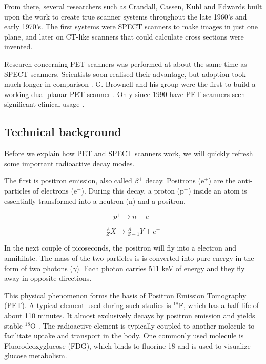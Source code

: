 From there, several researchers such as Crandall, Cassen, Kuhl and Edwards built
upon the work to create true scanner systems throughout the late 1960's and
early 1970's. The first systems were SPECT scanners to make images in just one
plane, and later on CT-like scanners that could calculate cross sections were
invented.

Research concerning PET scanners was performed at about the same time
as SPECT scanners. Scientists soon realised their advantage, but adoption took
much longer in comparison \cite{petreview}. G. Brownell and his group were the
first to build a working dual planar PET scanner \cite{brownell}. Only since
1990 have PET scanners seen significant clinical usage \cite{pethistory}.

\subsection{Technical background}
Before we explain how PET and SPECT scanners work, we will quickly refresh some
important radioactive decay modes.

The first is positron emission, also called $\beta^+$ decay. Positrons (e$^+$)
are the anti-particles of electrons (e$^-$). During this decay, a proton (p$^+$)
inside an atom is essentially transformed into a neutron (n) and a positron.

\begin{equation}
	p^+ \rightarrow n + e^+
\end{equation}

\begin{equation}
	{}_Z^AX \rightarrow {}_{Z-1}^AY + e^+
\end{equation}

In the next couple of picoseconds, the positron will fly into a electron and
annihilate. The mass of the two particles is is converted into pure energy in
the form of two photons ($\gamma$). Each photon carries 511 keV of energy and
they fly away in opposite directions.

This physical phenomenon forms the basis of Positron Emission Tomography (PET).
A typical element used during such studies is $^{18}$F, which has a half-life of
about 110 minutes. It almost exclusively decays by positron emission and yields
stable $^{18}$O \cite{suetens}. The radioactive element is typically coupled to
another molecule to facilitate uptake and transport in the body. One commonly
used molecule is Fluorodeoxyglucose (FDG), which binds to fluorine-18 and is
used to visualize glucose metabolism.

